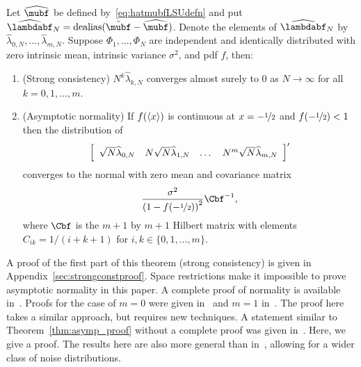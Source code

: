 \documentclass[journal]{IEEEtran}
\begin{document}

 
\begin{theorem} \label{thm:asymp_proof} 
Let $\widehat{\mubf}$ be defined by~\eqref{eq:hatmubfLSUdefn} and put $\widehat{\lambdabf}_N = \dealias(\tilde{\mubf} - \widehat{\mubf})$.  Denote the elements of $\widehat{\lambdabf}_N$ by $\widehat{\lambda}_{0,N}, \dots, \widehat{\lambda}_{m,N}$.  Suppose $\Phi_1, \dots, \Phi_N$ are independent and identically distributed with zero intrinsic mean, intrinsic variance $\sigma^2$, and pdf $f$, then: 
\begin{enumerate}
\item (Strong consistency) $N^k \widehat{\lambda}_{k,N}$ converges almost surely to $0$ as $N\rightarrow\infty$ for all $k = 0, 1, \dots, m$.
\item (Asymptotic normality) If $f(\left\langle x \right\rangle)$ is continuous at $x = -\nicefrac{1}{2}$ and $f(-\nicefrac{1}{2}) < 1$ then the distribution of
\[
\left[
\begin{array}
[c]{cccc}%
\sqrt{N} \widehat{\lambda}_{0,N} & N \sqrt{N}\widehat{\lambda}_{1,N}  & \dots & N^m\sqrt{N} \widehat{\lambda}_{m,N}
\end{array}
\right]^\prime
\]
converges to the normal with zero mean and covariance matrix
\[
\frac{\sigma^2}{\left(1-f( -\nicefrac{1}{2}) \right)^{2}} \Cbf^{-1},
\]
where $\Cbf$ is the $m+1$ by $m+1$ Hilbert matrix with elements $C_{ik} = 1/(i + k + 1)$ for $i,k \in \{0, 1, \dots, m\}$.
\end{enumerate}
\end{theorem}

A proof of the first part of this theorem (strong consistency) is given in Appendix~\ref{sec:strongconstproof}.  Space restrictions make it impossible to prove asymptotic normality in this paper.  A complete proof of normality is available in~\cite{McKilliam_arxiv_pps_unwrapping_2012}.  Proofs for the case of $m=0$ were given in~\cite{McKilliam_mean_dir_est_sq_arc_length2010} and $m=1$ in~\cite{McKilliamFrequencyEstimationByPhaseUnwrapping2009}.  The proof here takes a similar approach, but requires new techniques.  %
A statement similar to Theorem~\ref{thm:asymp_proof} without a complete proof was given in~\cite{McKilliam_polyphase_est_icassp_2011}.  Here, we give a proof.  The results here are also more general than in~\cite{McKilliam_polyphase_est_icassp_2011}, allowing for a wider class of noise distributions.
\end{document}
